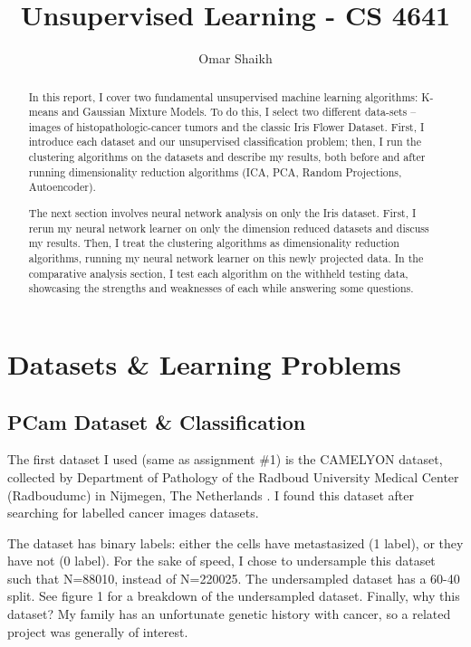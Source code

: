 \documentclass[letter]{article}
\begin{document}
\title{Unsupervised Learning - CS 4641}
\author{Omar Shaikh}
\maketitle

\begin{abstract}
    In this report, I cover two fundamental unsupervised machine learning algorithms: K-means and Gaussian Mixture Models. To do this, I select two different data-sets -- images of histopathologic-cancer tumors and the classic Iris Flower Dataset. First, I introduce each dataset and our unsupervised classification problem; then, I run the clustering algorithms on the datasets and describe my results, both before and after running dimensionality reduction algorithms (ICA, PCA, Random Projections, Autoencoder). 
    
    The next section involves neural network analysis on only the Iris dataset. First, I rerun my neural network learner on only the dimension reduced datasets and discuss my results. Then, I treat the clustering algorithms as dimensionality reduction algorithms, running my neural network learner on this newly projected data. In the comparative analysis section, I test each algorithm on the withheld testing data, showcasing the strengths and weaknesses of each while answering some questions.
\end{abstract}

\section{Datasets \& Learning Problems}
\subsection{PCam Dataset \& Classification}

The first dataset I used (same as assignment \#1) is the CAMELYON dataset, collected by Department of Pathology of the Radboud University Medical Center (Radboudumc) in Nijmegen, The Netherlands \autocite{doi:10.1093/gigascience/giy065}. I found this dataset after searching for labelled cancer images datasets.

The dataset has binary labels: either the cells have metastasized (1 label), or they have not (0 label). For the sake of speed, I chose to undersample this dataset such that N=88010, instead of N=220025. The undersampled dataset has a 60-40 split. See figure 1 for a breakdown of the undersampled dataset. Finally, why this dataset? My family has an unfortunate genetic history with cancer, so a related project was generally of interest.
\end{document}
